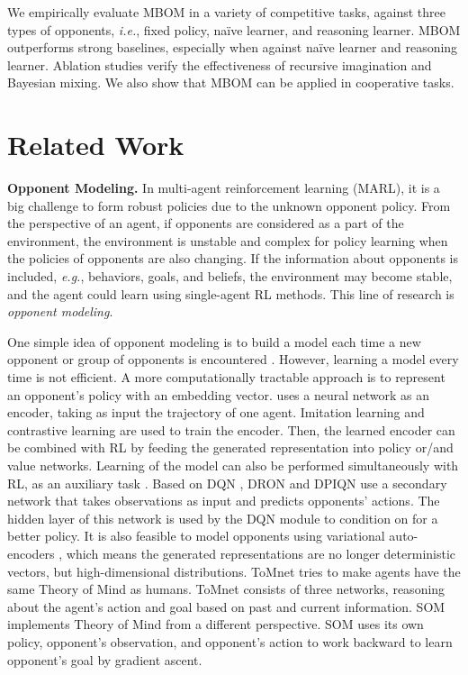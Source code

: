 \documentclass{article}
\begin{document}
We empirically evaluate MBOM in a variety of competitive tasks, against three types of opponents, \textit{i.e.}, fixed policy, na\"ive learner, and reasoning learner. MBOM outperforms strong baselines, especially when against na\"ive learner and reasoning learner. Ablation studies verify the effectiveness of recursive imagination and Bayesian mixing. We also show that MBOM can be applied in cooperative tasks.

\section{Related Work}

\textbf{Opponent Modeling.}
In multi-agent reinforcement learning (MARL), it is a big challenge to form robust policies due to the unknown opponent policy. From the perspective of an agent, if opponents are considered as a part of the environment, the environment is unstable and complex for policy learning when the policies of opponents are also changing. If the information about opponents is included, \emph{e.g.}, behaviors, goals, and beliefs, the environment may become stable, and the agent could learn using single-agent RL methods. This line of research is \emph{opponent modeling}. 

One simple idea of opponent modeling is to build a model each time a new opponent or group of opponents is encountered \citep{zheng2018deep}. However, learning a model every time is not efficient. A more computationally tractable approach is to represent an opponent's policy with an embedding vector. \citet{grover2018learning} uses a neural network as an encoder, taking as input the trajectory of one agent. Imitation learning and contrastive learning are used to train the encoder. Then, the learned encoder can be combined with RL by feeding the generated representation into policy or/and value networks. Learning of the model can also be performed simultaneously with RL, as an auxiliary task \citep{2016Reinforcement}. Based on DQN \citep{mnih2015DQN}, DRON \citep{he2016opponent} and DPIQN \citep{hong2018deep} use a secondary network that takes observations as input and predicts opponents’ actions. The hidden layer of this network is used by the DQN module to condition on for a better policy. It is also feasible to model opponents using variational auto-encoders \citep{papoudakis2020variational}, which means the generated representations are no longer deterministic vectors, but high-dimensional distributions. ToMnet \citep{rabinowitz2018machine} tries to make agents have the same Theory of Mind \citep{premack1978does} as humans. ToMnet consists of three networks, reasoning about the agent's action and goal based on past and current information. SOM \citep{raileanu2018modeling} implements Theory of Mind from a different perspective. SOM uses its own policy, opponent's observation, and opponent's action to work backward to learn opponent's goal by gradient ascent.
\end{document}
